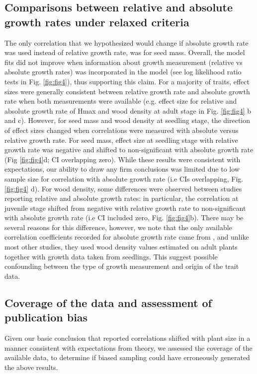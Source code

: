 \documentclass[a4paper,11pt]{article}
\begin{document}
\subsection*{Comparisons between relative and absolute growth rates under relaxed criteria}

The only correlation that we hypothesized would change if absolute growth rate was used instead of relative growth rate, was for seed mass. Overall, the model fits did not improve when information about growth measurement (relative vs absolute growth rates) was incorporated in the model (see log likelihood ratio tests in Fig. \ref{fig:fig4}), thus supporting this claim. For a majority of traits, effect sizes were generally consistent between relative growth rate and absolute growth rate when both measurements were available (e.g. effect size for relative and absolute growth rate of Hmax and wood density at adult stage in Fig. \ref{fig:fig4} b and c). However, for seed mass and wood density at seedling stage, the direction of effect sizes changed when correlations were measured with absolute versus relative growth rate. For seed mass, effect size at seedling stage with relative growth rate was negative and shifted to non-significant with absolute growth rate (Fig \ref{fig:fig4}d; CI overlapping zero). While these results were consistent with expectations, our ability to draw any firm conclusions was limited due to low sample size for correlation with absolute growth rate (i.e CIs overlapping, Fig. \ref{fig:fig4} d). For wood density, some differences were observed between studies reporting relative and absolute growth rates: in particular, the correlation at juvenile stage shifted from negative with relative growth rate to non-significant with absolute growth rate (i.e CI included zero, Fig. \ref{fig:fig4}b). There may be several reasons for this difference, however, we note that the only available correlation coefficients recorded for absolute growth rate came from \citet{Augspurger:1984ct}, and unlike most other studies, they used wood density values estimated on adult plants together with growth data taken from seedlings. This suggest possible confounding between the type of growth measurement and origin of the trait data.

\subsection*{Coverage of the data and assessment of publication bias}

Given our basic conclusion that reported correlations shifted with plant size in a manner consistent with expectations from theory, we assessed the coverage of the available data, to determine if biased sampling could have erroneously generated the above results.
\end{document}
